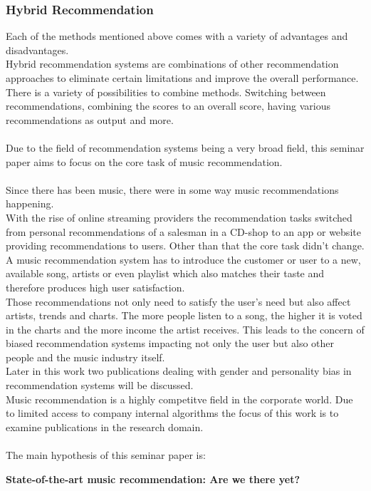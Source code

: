 \documentclass[runningheads,a4paper]{llncs}
\begin{document}
\subsubsection{Hybrid Recommendation}
Each of the methods mentioned above comes with a variety of advantages and disadvantages. \\
Hybrid recommendation systems are combinations of other recommendation approaches to eliminate certain 
limitations and improve the overall performance. 
There is a variety of possibilities to combine methods.
Switching between recommendations, combining the scores to an overall score, having various recommendations as output
 and more. \cite{burke2002hybrid}\\
\\
Due to the field of recommendation systems being a very broad field, this seminar paper aims to 
focus on the core task of music recommendation. \\
\\
Since there has been music, there were in some way music recommendations happening. \\
With the rise of online streaming providers the recommendation tasks switched from personal recommendations 
of a salesman in a CD-shop to an app or website providing recommendations to users.
Other than that the core task didn't change. A music recommendation system has to introduce the customer or user to a new, available song, artists or even playlist which 
also matches their taste and therefore produces high user satisfaction.\\
Those recommendations not only need to satisfy the user's need but also affect artists, trends and charts.
The more people listen to a song, the higher it is voted in the charts and the more income the artist receives. 
This leads to the concern of biased recommendation systems impacting not only the user but also other people and the music industry itself. \\
Later in this work two publications dealing with gender and personality bias in recommendation systems will be discussed. \\
Music recommendation is a highly competitve field in the corporate world. 
Due 
to limited access to company internal algorithms the focus of this work is to examine publications in the research domain. \\
\\ 
The main hypothesis of this seminar paper is:
\begin{center}
  \textbf{State-of-the-art music recommendation: Are we there yet?}
\end{center}
\end{document}
